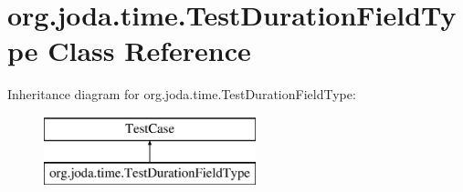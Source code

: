 \hypertarget{classorg_1_1joda_1_1time_1_1_test_duration_field_type}{\section{org.\-joda.\-time.\-Test\-Duration\-Field\-Type Class Reference}
\label{classorg_1_1joda_1_1time_1_1_test_duration_field_type}
}
Inheritance diagram for org.\-joda.\-time.\-Test\-Duration\-Field\-Type\-:\begin{figure}[H]
\begin{center}
\leavevmode
\includegraphics[height=2.000000cm]{classorg_1_1joda_1_1time_1_1_test_duration_field_type}
\end{center}
\end{figure}
